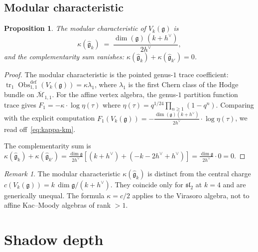 \documentclass[11pt]{article}
\theoremstyle{plain}
\newtheorem{proposition}[theorem]{Proposition}
\theoremstyle{definition}
\theoremstyle{remark}
\newtheorem{remark}[theorem]{Remark}
\newcommand{\fg}{\mathfrak{g}}
\newcommand{\fsl}{\mathfrak{sl}}
\newcommand{\ghat}{\widehat{\fg}}
\numberwithin{equation}{section}
\begin{document}
\subsection{Modular characteristic}

\begin{proposition}\label{prop:kappa-km}
The modular characteristic of $V_k(\fg)$ is
\begin{equation}\label{eq:kappa-km}
\kappa(\ghat_k)
\;=\; \frac{\dim(\fg)\,(k + h^\vee)}{2h^\vee},
\end{equation}
and the complementarity sum vanishes:
$\kappa(\ghat_k) + \kappa(\ghat_{k'}) = 0$.
\end{proposition}

\begin{proof}
The modular characteristic is the pointed genus-$1$ trace
coefficient:
$\operatorname{tr}_1\operatorname{Obs}^{\mathrm{def}}_{1,1}(V_k(\fg))
=\kappa\lambda_1$, where $\lambda_1$ is the first
Chern class of the Hodge bundle on $\overline{\mathcal{M}}_{1,1}$.
For the affine vertex algebra, the genus-$1$ partition
function trace gives $F_1 = -\kappa \cdot \log\eta(\tau)$
where $\eta(\tau) = q^{1/24}\prod_{n \geq 1}(1-q^n)$.
Comparing with the explicit computation
$F_1(V_k(\fg)) = -\frac{\dim(\fg)(k+h^\vee)}{2h^\vee}
\cdot \log\eta(\tau)$, we read off~\eqref{eq:kappa-km}.

The complementarity sum is
$\kappa(\ghat_k) + \kappa(\ghat_{k'})
= \frac{\dim\fg}{2h^\vee}[(k{+}h^\vee) + (-k{-}2h^\vee{+}h^\vee)]
= \frac{\dim\fg}{2h^\vee} \cdot 0 = 0$.
\end{proof}

\begin{remark}\label{rem:kappa-central-charge}
The modular characteristic $\kappa(\ghat_k)$ is distinct
from the central charge $c(V_k(\fg)) =
k\,\dim\fg/(k{+}h^\vee)$. They coincide only for
$\fsl_2$ at $k = 4$ and are generically unequal.
The formula $\kappa = c/2$ applies to the Virasoro algebra,
not to affine Kac--Moody algebras of rank $> 1$.
\end{remark}


\section{Shadow depth}\label{sec:shadow-depth}
\end{document}
